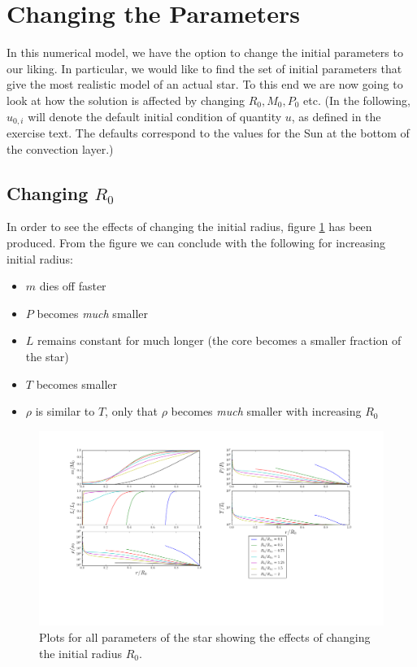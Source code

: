 \documentclass[11pt,twocolumn]{article}
\begin{document}
\section{Changing the Parameters}
\label{sec:changing-the-parameters}
In this numerical model, we have the option to change the initial
parameters to our liking. In particular, we would like to find the set
of initial parameters that give the most realistic model of an actual
star. To this end we are now going to look at how the solution is
affected by changing $R_0,M_0, P_0$ etc. (In the following, $u_{0,i}$
will denote the default initial condition of quantity $u$, as defined
in the exercise text. The defaults correspond to the values for the
Sun at the bottom of the convection layer.)

\subsection{Changing $R_0$}
In order to see the effects of changing the initial radius, figure
\ref{fig:R-variation} has been produced. From the figure we can
conclude with the following for increasing initial radius:

\begin{itemize}
  \item $m$ dies off faster
  \item $P$ becomes \emph{much} smaller
\item $L$ remains constant for much longer (the core becomes a smaller
  fraction of the star)
\item $T$ becomes smaller
\item $\rho$ is similar to $T$, only that $\rho$ becomes \emph{much}
  smaller with increasing $R_0$
\end{itemize}

\begin{figure}[ht]
  \centering
  \includegraphics[width=\linewidth]{fig/R_variation.png}
  \caption{\label{fig:R-variation} Plots for all parameters of the star
  showing the effects of changing the initial radius $R_0$.}
\end{figure}
\end{document}
